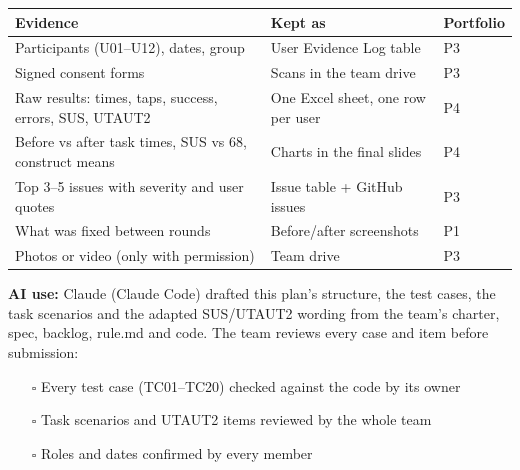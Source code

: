 \documentclass{article}
\begin{document}
\begin{center}
\small
\begin{tabularx}{\linewidth}{|Y|L{5.2cm}|L{1.7cm}|}
\hline
\textbf{Evidence} & \textbf{Kept as} & \textbf{Portfolio} \\ \hline
Participants (U01--U12), dates, group & User Evidence Log table & P3 \\ \hline
Signed consent forms & Scans in the team drive & P3 \\ \hline
Raw results: times, taps, success, errors, SUS, UTAUT2 & One Excel sheet, one row per user & P4 \\ \hline
Before vs after task times, SUS vs 68, construct means & Charts in the final slides & P4 \\ \hline
Top 3--5 issues with severity and user quotes & Issue table + GitHub issues & P3 \\ \hline
What was fixed between rounds & Before/after screenshots & P1 \\ \hline
Photos or video (only with permission) & Team drive & P3 \\ \hline
\end{tabularx}
\end{center}

\textbf{AI use:} Claude (Claude Code) drafted this plan's structure, the test cases, the task scenarios and the adapted SUS/UTAUT2 wording from the team's charter, spec, backlog, rule.md and code. The team reviews every case and item before submission:

\begin{itemize}
\item[$\square$] Every test case (TC01--TC20) checked against the code by its owner
\item[$\square$] Task scenarios and UTAUT2 items reviewed by the whole team
\item[$\square$] Roles and dates confirmed by every member
\end{itemize}
\end{document}

